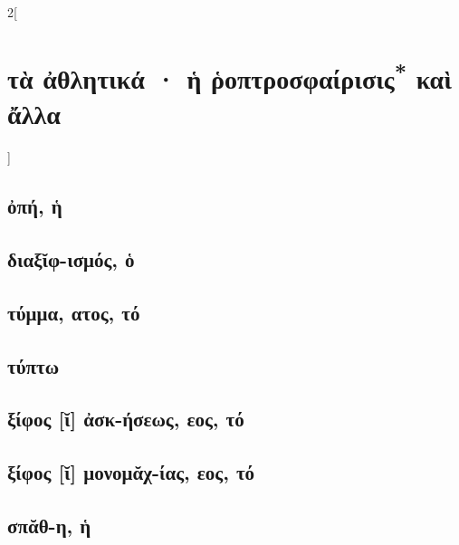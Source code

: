 \documentclass{book}
\begin{document}
\begin{multicols}{2}[\section{τὰ ἀθλητικά · ἡ ῥοπτροσφαίρισις\textsuperscript{*} καὶ ἄλλα}]
\subsection{ὀπή, ἡ}
\subsection{διαξῐφ-ισμός, ὁ}
\subsection{τύμμα, ατος, τό}
\subsection{τύπτω}
\subsection{ξίφος [ῐ] ἀσκ-ήσεως, εος, τό}
\subsection{ξίφος [ῐ] μονομᾰχ-ίας, εος, τό}
\subsection{σπᾰθ-η, ἡ}
~
\end{multicols}
\newpage  
\end{document}
